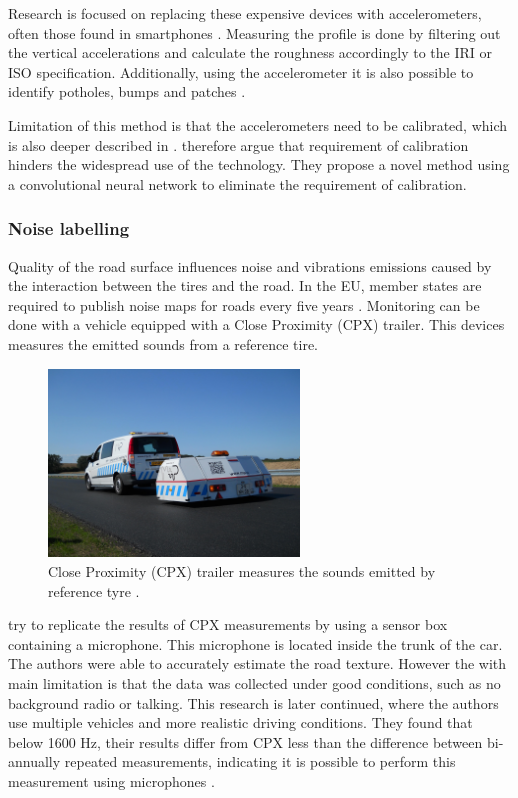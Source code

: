 Research is focused on replacing these expensive devices with accelerometers, often those found in smartphones \cite{Hanson2014,Buttlar2014,Gupta2020}. Measuring the profile is done by filtering out the vertical accelerations and calculate the roughness accordingly to the IRI or ISO specification. Additionally, using the accelerometer it is also possible to identify potholes, bumps and patches \cite{Lekshmipathy2020}. 

Limitation of this method is that the accelerometers need to be calibrated, which is also deeper described in \cite{Gupta2020}.  therefore argue that requirement of calibration hinders the widespread use of the technology. They propose a novel method using a convolutional neural network to eliminate the requirement of calibration.


\subsubsection{Noise labelling}
Quality of the road surface influences noise and vibrations emissions caused by the interaction between the tires and the road. In the EU, member states are required to publish noise maps for roads every five years \cite{EU2002}. Monitoring can be done with a vehicle equipped with a Close Proximity (CPX) trailer. This devices measures the emitted sounds from a reference tire.

\begin{figure}[ht]
\begin{center}
\includegraphics[height=5cm,keepaspectratio]{images/2_literature/cpx-trailer.jpg}
\end{center}
\caption{Close Proximity (CPX) trailer measures the sounds emitted by reference tyre \cite{MP2020}.}
\end{figure}

 try to replicate the results of CPX measurements by using a sensor box containing a microphone. This microphone is located inside the trunk of the car. The authors were able to accurately estimate the road texture. However the with main limitation is that the data was collected under good conditions, such as no background radio or talking. This research is later continued, where the authors use multiple vehicles and more realistic driving conditions. They found that below 1600 Hz, their results differ from CPX less than the difference between bi-annually repeated measurements, indicating it is possible to perform this measurement using microphones \cite{Hauwermeiren2021}.


